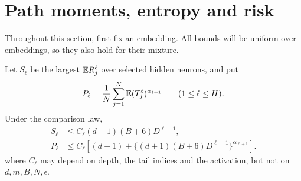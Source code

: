 \section{Path moments, entropy and risk}
\label{sec:moments}
Throughout this section, first fix an embedding. All bounds will be uniform over embeddings, so they also hold for their mixture.

\begin{lemma}
\label{lem:path-moments}
Let $S_\ell$ be the largest $\mathbb E R_j^\ell$ over selected hidden neurons, and put
\[
 P_\ell=\frac1N\sum_{j=1}^N\mathbb E(T_j^\ell)^{\alpha_{\ell+1}}
 \qquad(1\le\ell\le H).
\]
Under the comparison law,
\begin{align}
 S_\ell&\le C_\ell(d+1)(B+6)D^{\ell-1},\\
 P_\ell&\le C_\ell\left[(d+1)
       +\{(d+1)(B+6)D^{\ell-1}\}^{\alpha_{\ell+1}}\right].
 \label{eq:path-moments}
\end{align}
where $C_\ell$ may depend on depth, the tail indices and the activation, but not on $d,m,B,N,\epsilon$.
\end{lemma}
